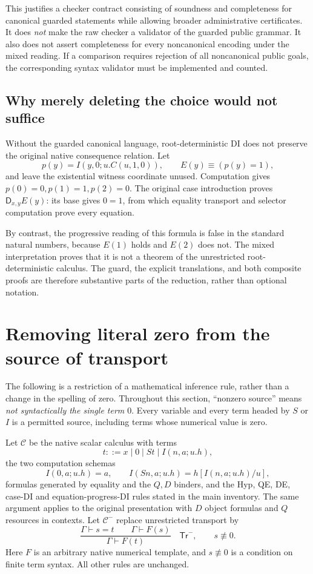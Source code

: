 \documentclass[11pt,letterpaper]{article}
\theoremstyle{definition}
\begin{document}
This justifies a checker contract consisting of soundness and
completeness for canonical guarded statements while allowing broader
administrative certificates.  It does \emph{not} make the raw checker
a validator of the guarded public grammar.  It also does not assert
completeness for every noncanonical encoding under the mixed reading.
If a comparison requires rejection of all noncanonical public goals,
the corresponding syntax validator must be implemented and counted.

\subsection{Why merely deleting the choice would not suffice}

Without the guarded canonical language, root-deterministic DI does
not preserve the original native consequence relation.  Let
\[
 p(y)=I(y,0;u.C(u,1,0)),\qquad E(y)\equiv(p(y)=1),
\]
and leave the existential witness coordinate unused.  Computation
gives $p(0)=0,p(1)=1,p(2)=0$.  The original case introduction proves
$\mathsf D_{x,y}E(y)$: its base gives $0=1$, from which equality
transport and selector computation prove every equation.

By contrast, the progressive reading of this formula is false in the
standard natural numbers, because $E(1)$ holds and $E(2)$ does not.
The mixed interpretation proves that it is not a theorem of the
unrestricted root-deterministic calculus.  The guard, the explicit
translations, and both composite proofs are therefore substantive
parts of the reduction, rather than optional notation.


\section{Removing literal zero from the source of transport}
\label{zs:section}

The following is a restriction of a mathematical inference rule, rather
than a change in the spelling of zero. Throughout this section,
``nonzero source'' means \emph{not syntactically the single term $0$}.
Every variable and every term headed by $S$ or $I$ is a permitted source,
including terms whose numerical value is zero.

Let $\mathcal C$ be the native scalar calculus with terms
\[
 t::=x\mid0\mid St\mid I(n,a;u.h),
\]
the two computation schemas
\[
 I(0,a;u.h)=a,\qquad
 I(Sn,a;u.h)=h[I(n,a;u.h)/u],
\]
formulas generated by equality and the $Q,D$ binders, and the Hyp, QE,
DE, case-DI and equation-progress-DI rules stated in the main inventory.
The same argument applies to the original presentation with $D$ object
formulas and $Q$ resources in contexts. Let $\mathcal C^{-}$ replace
unrestricted transport by
\[
 \frac{\Gamma\vdash s=t\qquad\Gamma\vdash F(s)}
      {\Gamma\vdash F(t)}
 \quad\mathsf{Tr}^{-},\qquad s\not\equiv0.
 \tag{Tr$^-$}\label{zs:restricted-rule}
\]
Here $F$ is an arbitrary native numerical template, and $s\not\equiv0$
is a condition on finite term syntax. All other rules are unchanged.
\end{document}
